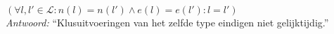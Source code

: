 
\item $(\forall l, l' \in \mathcal{L} : n(l) = n(l') \wedge e(l) = e(l') : l = l')$ \\


\emph{Antwoord:} ``Klusuitvoeringen van het zelfde type eindigen niet gelijktijdig.'' \\

